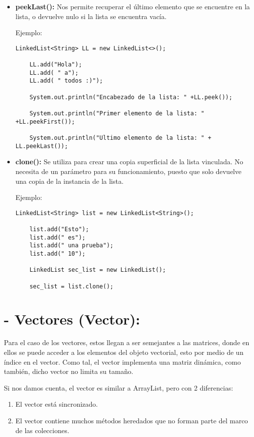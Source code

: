 \documentclass[12pt, letterpaper]{article} %
\begin{document}
\begin{itemize}
    \item \textbf{peekLast():} Nos permite recuperar el último elemento que se encuentre en la lista, o devuelve nulo si la lista se encuentra vacía.

    Ejemplo:
    \lstset{language = Java, breaklines=true, basicstyle=\footnotesize}
    \begin{lstlisting}[frame=single]
    LinkedList<String> LL = new LinkedList<>();

    LL.add("Hola");  
    LL.add( " a");
    LL.add( " todos :)");

    System.out.println("Encabezado de la lista: " +LL.peek());

    System.out.println("Primer elemento de la lista: " +LL.peekFirst());

    System.out.println("Ultimo elemento de la lista: " + LL.peekLast());
    \end{lstlisting}

    \item \textbf{clone():} Se utiliza para crear una copia superficial de la lista vinculada. No necesita de un parámetro para su funcionamiento, puesto que solo devuelve una copia de la instancia de la lista.

    Ejemplo:
    \lstset{language = Java, breaklines=true, basicstyle=\footnotesize}
    \begin{lstlisting}[frame=single]
    LinkedList<String> list = new LinkedList<String>();

    list.add("Esto");
    list.add(" es");
    list.add(" una prueba");
    list.add(" 10");

    LinkedList sec_list = new LinkedList();

    sec_list = list.clone();
    \end{lstlisting}
    
\end{itemize}

\section*{- Vectores (Vector):}
Para el caso de los vectores, estos llegan a ser semejantes a las matrices, donde en ellos se puede acceder a los elementos del objeto vectorial, esto por medio de un índice en el vector. Como tal, el vector implementa una matriz dinámica, como también, dicho vector no limita su tamaño.
\vspace{5mm} 

Si nos damos cuenta, el vector es similar a ArrayList, pero con 2 diferencias:
\begin{enumerate}
    \item El vector está sincronizado.
    \item El vector contiene muchos métodos heredados que no forman parte del marco de las colecciones.
\end{enumerate}
\end{document}
